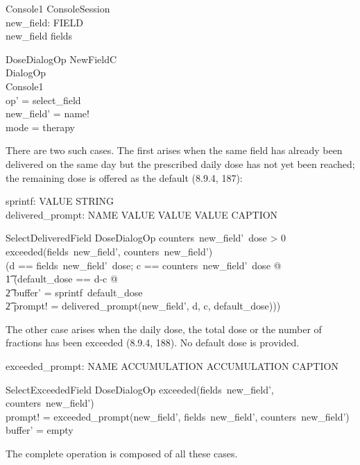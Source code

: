\begin{schema}{Console1}
	ConsoleSession \\
	new\_field: FIELD \\
\where
	new\_field \in \dom fields
\end{schema}

\begin{schema}{DoseDialogOp}
	NewFieldC \\
	DialogOp \\
	\Delta Console1 \\
\where
	op' = select\_field \\
	new\_field' = name! \\
	mode = therapy \\
\end{schema}
There are two such cases. The first arises when the same field has
already been delivered on the same day but the prescribed daily dose
has not yet been reached; the remaining dose is offered as the default
(8.9.4, 187):

\begin{axdef}
sprintf: VALUE \fun STRING \\
delivered\_prompt: NAME \cross VALUE \cross VALUE \cross VALUE \fun CAPTION \\
\end{axdef}

\begin{schema}{SelectDeliveredField}
	DoseDialogOp
\where
	counters~new\_field'~dose > 0 \\
	\lnot exceeded(fields~new\_field', counters~new\_field') \\
	(\LET d == fields~new\_field'~dose; c == counters~new\_field'~dose @ \\
\t1	 (\LET default\_dose == d-c @ \\
\t2	  buffer' = sprintf~default\_dose \land \\
\t2	   prompt! = delivered\_prompt(new\_field', d, c, default\_dose)))
\end{schema}
The other case arises when the daily dose, the total dose or the
number of fractions has been exceeded (8.9.4, 188).  No default dose
is provided.

\begin{axdef}
exceeded\_prompt: NAME \cross ACCUMULATION \cross ACCUMULATION \fun CAPTION
\end{axdef}

\begin{schema}{SelectExceededField}
	DoseDialogOp
\where
	exceeded(fields~new\_field', counters~new\_field') \\
	prompt! = exceeded\_prompt(new\_field', fields~new\_field', counters~new\_field') \\
	buffer' = empty \\
\end{schema}
The complete operation is composed of all these cases.


